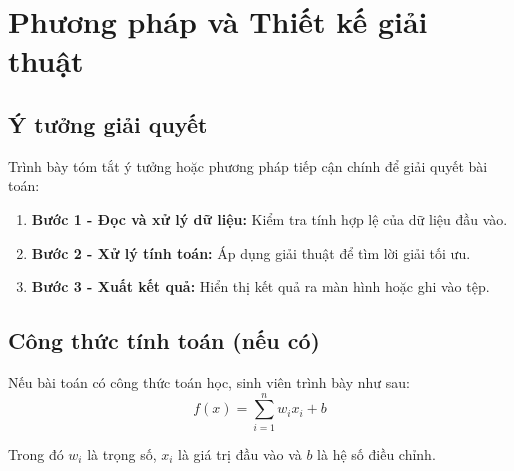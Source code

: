 \section{Phương pháp và Thiết kế giải thuật}

\subsection{Ý tưởng giải quyết}
Trình bày tóm tắt ý tưởng hoặc phương pháp tiếp cận chính để giải quyết bài toán:
\begin{enumerate}
    \item \textbf{Bước 1 - Đọc và xử lý dữ liệu:} Kiểm tra tính hợp lệ của dữ liệu đầu vào.
    \item \textbf{Bước 2 - Xử lý tính toán:} Áp dụng giải thuật để tìm lời giải tối ưu.
    \item \textbf{Bước 3 - Xuất kết quả:} Hiển thị kết quả ra màn hình hoặc ghi vào tệp.
\end{enumerate}

\subsection{Công thức tính toán (nếu có)}
Nếu bài toán có công thức toán học, sinh viên trình bày như sau:
\begin{equation}
    f(x) = \sum_{i=1}^{n} w_i x_i + b
    \label{eq:simple_formula}
\end{equation}

Trong đó $w_i$ là trọng số, $x_i$ là giá trị đầu vào và $b$ là hệ số điều chỉnh.
